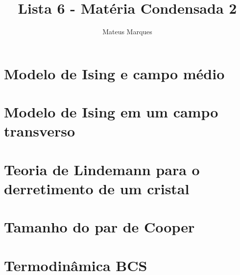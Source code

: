 \documentclass[a4paper,10pt]{article}
\title{\Huge{\textbf{Lista 6 - Matéria Condensada 2}}}
\author{Mateus Marques}
\begin{document}
\maketitle


\section{Modelo de Ising e campo médio}



\pagebreak


\section{Modelo de Ising em um campo transverso}



\pagebreak


\section{Teoria de Lindemann para o derretimento de um cristal}



\pagebreak


\section{Tamanho do par de Cooper}



\pagebreak


\section{Termodinâmica BCS}



\pagebreak
\end{document}
